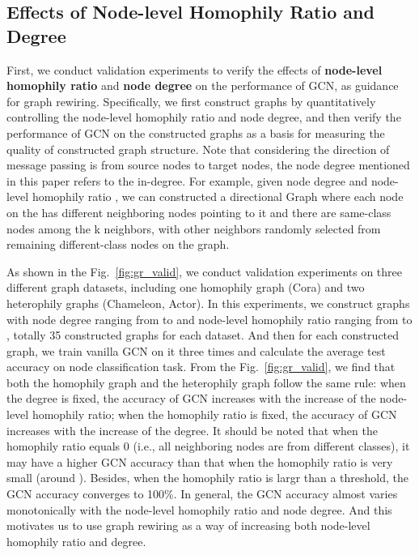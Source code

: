 \documentclass[sigconf]{acmart}
\begin{document}
    \subsection{Effects of Node-level Homophily Ratio and Degree}
	\label{subsec:finding_hr_deg}
	 First, we conduct validation experiments to verify the effects of \textbf{node-level homophily ratio} \cite{pei2020geom, du2021gbk} and \textbf{node degree} on the performance of GCN, as guidance for graph rewiring. Specifically, we first construct graphs by quantitatively controlling the node-level homophily ratio and node degree, and then verify the performance of GCN on the constructed graphs as a basis for measuring the quality of constructed graph structure. Note that considering the direction of message passing is from source nodes to target nodes, the node degree mentioned in this paper refers to the in-degree. For example, given node degree  and node-level homophily ratio , we can constructed a directional Graph  where each node on the  has  different neighboring nodes pointing to it and there are  same-class nodes among the k neighbors, with other  neighbors randomly selected from remaining different-class nodes on the graph.
	
	
	
	
	
	
	As shown in the Fig.~\ref{fig:gr_valid}, we conduct validation experiments on three different graph datasets, including one homophily graph (Cora) and two heterophily graphs (Chameleon, Actor). In this experiments, we construct graphs  with node degree  ranging from  to  and node-level homophily ratio  ranging from  to , totally 35 constructed graphs for each dataset. And then for each constructed graph, we train vanilla GCN \cite{GCN} on it three times and calculate the average test accuracy on node classification task. From the Fig.~\ref{fig:gr_valid}, we find that both the homophily graph and the heterophily graph follow the same rule: when the degree is fixed, the accuracy of GCN increases with the increase of the node-level homophily ratio; when the homophily ratio is fixed, the accuracy of GCN increases with the increase of the degree. It should be noted that when the homophily ratio  equals 0 (i.e., all neighboring nodes are from different classes), it may have a higher GCN accuracy than that when the homophily ratio is very small (around ).  Besides, when the homophily ratio  is largr than a threshold, the GCN accuracy converges to 100\%. In general, the GCN accuracy almost varies monotonically with the node-level homophily ratio and node degree. And this motivates us to use graph rewiring as a way of increasing both node-level homophily ratio and degree.
	
\end{document}
